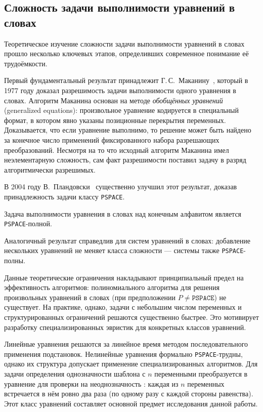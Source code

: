 \documentclass[14pt, russian]{scrartcl}
\begin{document}
\subsection{Сложность задачи выполнимости уравнений в словах}

Теоретическое изучение сложности задачи выполнимости уравнений в словах прошло
несколько ключевых этапов, определивших современное понимание её трудоёмкости.

Первый фундаментальный результат принадлежит Г.\,С.~Маканину~\cite{makanin1977},
который в 1977 году доказал разрешимость задачи выполнимости одного уравнения
в словах. Алгоритм Маканина основан на методе \emph{обобщённых уравнений}
(generalized equations): произвольное уравнение кодируется в специальный формат,
в котором явно указаны позиционные перекрытия переменных. Доказывается, что если
уравнение выполнимо, то решение может быть найдено за конечное число применений
фиксированного набора разрешающих преобразований. Несмотря на то что исходный
алгоритм Маканина имел неэлементарную сложность, сам факт разрешимости
поставил задачу в разряд алгоритмически разрешимых.

В 2004 году В.~Пландовски~\cite{plandowski2004} существенно улучшил этот результат,
доказав принадлежность задачи классу \texttt{PSPACE}.

\begin{Theorem}[Пландовски, 2004]
Задача выполнимости уравнения в словах над конечным алфавитом является
\texttt{PSPACE}-полной.
\end{Theorem}

Аналогичный результат справедлив для систем уравнений в словах: добавление
нескольких уравнений не меняет класса сложности --- системы также
\texttt{PSPACE}-полны.

Данные теоретические ограничения накладывают принципиальный предел на
эффективность алгоритмов: полиномиального алгоритма для решения произвольных
уравнений в словах (при предположении $P \neq \texttt{PSPACE}$) не существует.
На практике, однако, задачи с небольшим числом переменных и структурированных
ограничений решаются существенно быстрее. Это мотивирует разработку
специализированных эвристик для конкретных классов уравнений.



Линейные уравнения решаются за линейное время методом последовательного
применения подстановок. Нелинейные уравнения формально \texttt{PSPACE}-трудны,
однако их структура допускает применение специализированных алгоритмов.
Для задачи определения однозначности шаблона с $n$ переменными преобразуется в уравнение для проверки на 
неоднозначность : каждая из $n$ переменных встречается
в нём ровно два раза (по одному разу с каждой стороны равенства).
Этот класс уравнений составляет основной предмет исследования данной работы.
\end{document}

